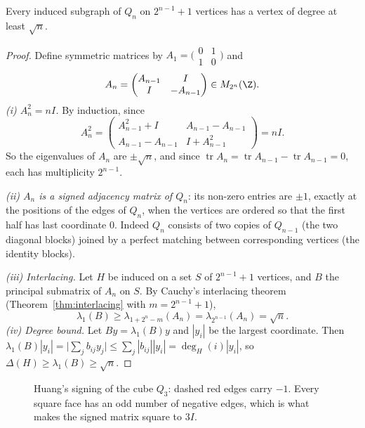 \begin{theorem}[Huang, 2019]\label{thm:huang}
Every induced subgraph of $Q_n$ on $2^{n-1}+1$ vertices has a vertex of degree at least $\sqrt n$.
\end{theorem}
\begin{proof}
Define symmetric matrices by $A_1=\bigl(\begin{smallmatrix}0&1\\1&0\end{smallmatrix}\bigr)$ and
\[
A_n=\begin{pmatrix}A_{n-1}&I\\I&-A_{n-1}\end{pmatrix}\in M_{2^n}(\Z).
\]
\emph{(i) $A_n^2=nI$.} By induction, since
\[
A_n^2=\begin{pmatrix}A_{n-1}^2+I&A_{n-1}-A_{n-1}\\A_{n-1}-A_{n-1}&I+A_{n-1}^2\end{pmatrix}=nI.
\] So the eigenvalues of $A_n$ are $\pm\sqrt n$, and since $\operatorname{tr}A_n=\operatorname{tr}A_{n-1}-
\operatorname{tr}A_{n-1}=0$, each has multiplicity $2^{n-1}$.

\emph{(ii) $A_n$ is a signed adjacency matrix of $Q_n$}: its non-zero entries are $\pm1$, exactly at the positions of the edges of $Q_n$,
when the vertices are ordered so that the first half has last coordinate $0$. Indeed $Q_n$ consists of two copies of $Q_{n-1}$ (the two
diagonal blocks) joined by a perfect matching between corresponding vertices (the identity blocks).

\emph{(iii) Interlacing.} Let $H$ be induced on a set $S$ of $2^{n-1}+1$ vertices, and $B$ the principal submatrix of $A_n$ on $S$. By
Cauchy's interlacing theorem (Theorem~\ref{thm:interlacing} with $m=2^{n-1}+1$),
\[
\lambda_1(B)\ge\lambda_{1+2^n-m}(A_n)=\lambda_{2^{n-1}}(A_n)=\sqrt n.
\]
\emph{(iv) Degree bound.} Let $By=\lambda_1(B)y$ and $|y_i|$ be the largest coordinate. Then $\lambda_1(B)|y_i|=\bigl|\sum_jb_{ij}y_j\bigr|\le
\sum_j|b_{ij}||y_i|=\deg_H(i)|y_i|$, so $\Delta(H)\ge\lambda_1(B)\ge\sqrt n$.
\end{proof}

\begin{figure}[ht]
\centering
{}
\caption{Huang's signing of the cube $Q_3$: dashed red edges carry $-1$. Every square face has an odd number of negative edges,
which is what makes the signed matrix square to $3I$.}
\label{fig:huang}
\end{figure}

